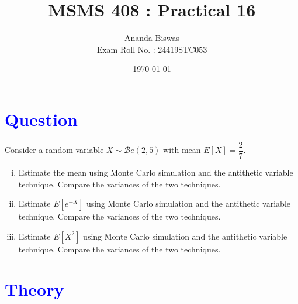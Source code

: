 \documentclass[11pt, a4paper]{article}\usepackage[]{graphicx}\usepackage[]{xcolor}
\title{MSMS 408 : Practical 16}
\author{{\fontsize{25}{20} \benyorithafont Ananda Biswas} \\[1em] Exam Roll No. : 24419STC053}
\date{\today}
\begin{document}
\maketitle


\section*{\faArrowAltCircleRight[regular] \textcolor{blue}{Question}}

Consider a random variable $X \sim \mathscr{B}e(2, 5)$ with mean $E[X] = \dfrac{2}{7}$.

\begin{enumerate}[(i)]
\item Estimate the mean using Monte Carlo simulation and the antithetic variable technique. Compare the variances of the two techniques.

\item Estimate $E[e^{-X}]$ using Monte Carlo simulation and the antithetic variable technique. Compare the variances of the two techniques.

\item Estimate $E[X^2]$ using Monte Carlo simulation and the antithetic variable technique. Compare the variances of the two techniques.
\end{enumerate}


\section*{\faArrowAltCircleRight[regular] \textcolor{blue}{Theory}}
\end{document}
